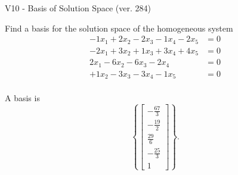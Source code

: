 \begin{exercise}
  \begin{exerciseTitle}V10 - Basis of Solution Space (ver. 284)\end{exerciseTitle}
  \begin{exerciseStatement}
    Find a basis for the solution space of the homogeneous system 
\begin{align*}
 -1 x_ 1 + 2 x_ 2 -2 x_ 3 -1 x_ 4 -2 x_ 5 &= 0  \\ 
  -2 x_ 1 + 3 x_ 2 + 1 x_ 3 + 3 x_ 4 + 4 x_ 5 &= 0  \\ 
  2 x_ 1 -6 x_ 2 -6 x_ 3 -2 x_ 4 &= 0  \\ 
  + 1 x_ 2 -3 x_ 3 -3 x_ 4 -1 x_ 5 &= 0  \\ 
 \end{align*}


 
  \end{exerciseStatement}

  \begin{exerciseAnswer}
   A basis is   
\[\left\{\left[\begin{array}{c}
-\frac{67}{3} \\
-\frac{19}{2} \\
\frac{29}{6} \\
-\frac{25}{3} \\
1
\end{array}\right]\right\}.\]

  


  \end{exerciseAnswer}
\end{exercise}